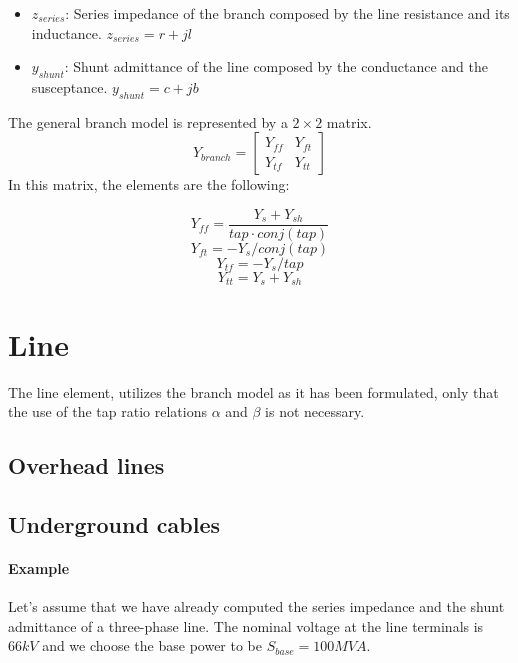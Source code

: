 \documentclass[a4paper,twoside,fleqn]{tufte-book}
\begin{document}
\begin{itemize}
	\item $z_{series}$: Series impedance of the branch composed by the line resistance and its inductance. $z_{series}=r + jl$
	
	\item $y_{shunt}$: Shunt admittance of the line composed by the conductance and the susceptance. $y_{shunt}=c+jb$\newline
\end{itemize}



The general branch model is represented by a $2 \times 2$ matrix.
$$
Y_{branch}=\left[ \begin{array}{ccc}
Y_{ff} & Y_{ft} \\
Y_{tf} & Y_{tt} \end{array} \right]
$$
In this matrix, the elements are the following:


$$Y_{ff} = \frac{Y_s + Y_{sh}}{tap \cdot conj(tap)}  $$
$$Y_{ft} = - Y_s / conj(tap)$$
$$Y_{tf} = - Y_s / tap$$
$$Y_{tt} = Y_s + Y_{sh}$$



\section{Line}

The line element, utilizes the branch model as it has been formulated, only that the use of the tap ratio relations $\alpha$ and $\beta$ is not necessary.


\subsection{Overhead lines}


\subsection{Underground cables}


\paragraph{Example}

Let's assume that we have already computed the series impedance and the shunt admittance of a three-phase line. The nominal voltage at the line terminals is $66kV$ and we choose the base power to be $S_{base}=100MVA$.
\end{document}
